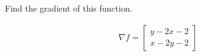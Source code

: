 Find the gradient of this function.

\begin{solution}
\begin{align*}
    \nabla f = \begin{bmatrix}
        y - 2x - 2 \\
        x - 2y - 2
    \end{bmatrix}
\end{align*}
\end{solution}